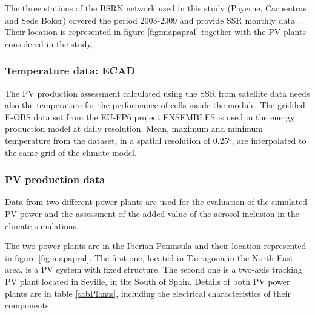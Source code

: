 The three stations of the BSRN network used in this study (Payerne, Carpentras and Sede Boker) covered the period 2003-2009 and provide SSR monthly data \cite*{Konig-Langlo2013}. Their location is represented in figure \ref{fig:mapapral} together with the PV plants considered in the study.   

\subsubsection{Temperature data: ECAD}

The PV production assessment calculated using the SSR from satellite data needs also the temperature for the performance of cells inside the module. The gridded E-OBS data set from the EU-FP6 project ENSEMBLES \cite*{Haylock2008} is used in the energy production model at daily resolution. Mean, maximum and minimum temperature from the dataset, in a spatial resolution of 0.25º, are interpolated to the same grid of the climate model. 

\subsubsection{PV production data}

Data from two different power plants are used for the evaluation of the simulated PV power and the assessment of the added value of the aerosol inclusion in the climate simulations.

The two power plants are in the Iberian Peninsula and their location represented in figure \ref{fig:mapapral}. The first one, located in Tarragona in the North-East area, is a PV system with fixed structure. The second one is a two-axis tracking PV plant located in Seville, in the South of Spain. Details of both PV power plants are in table \ref{tabPlants}, including the electrical characteristics of their components. 

